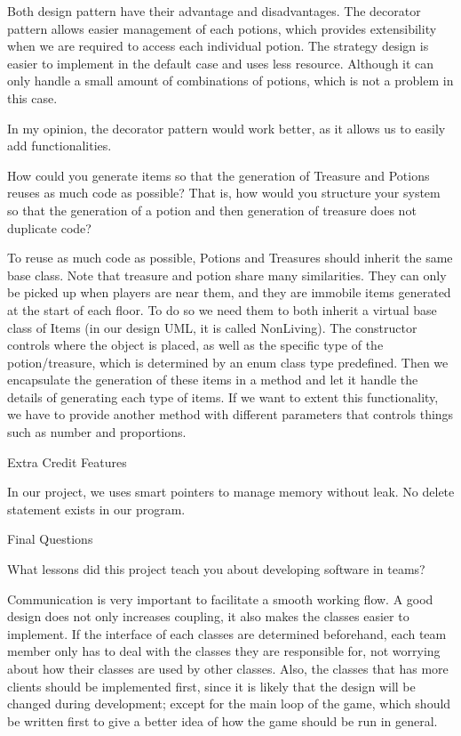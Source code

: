 \documentclass[11pt]{article}
\theoremstyle{plain} \newtheorem{theorem*}{Theorem}[subsection]
\begin{document}
Both design pattern have their advantage and disadvantages. The decorator
pattern allows easier management of each potions, which provides extensibility
when we are required to access each individual potion. The strategy design is
easier to implement in the default case and uses less resource. Although it can
only handle a small amount of combinations of potions, which is not a problem
in this case.  

In my opinion, the decorator pattern would work better, as it allows us to
easily add functionalities. 

How could you generate items so that the generation of Treasure and Potions
reuses as much code as possible? That is, how would you structure your system
so that the generation of a potion and then generation of treasure does not
duplicate code? 

To reuse as much code as possible, Potions and Treasures should inherit the
same base class. Note that treasure and potion share many similarities. They
can only be picked up when players are near them, and they are immobile items
generated at the start of each floor. To do so we need them to both inherit a
virtual base class of Items (in our design UML, it is called NonLiving). The
constructor controls where the object is placed, as well as the specific type
of the potion/treasure, which is determined by an enum class type predefined.
Then we encapsulate the generation of these items in a method and let it handle
the details of generating each type of items. If we want to extent this
functionality, we have to provide another method with different parameters that
controls things such as number and proportions. 



Extra Credit Features 

In our project, we uses smart pointers to manage memory without leak. No delete
statement exists in our program.  




Final Questions 

What lessons did this project teach you about developing software in teams? 

Communication is very important to facilitate a smooth working flow. A good
design does not only increases coupling, it also makes the classes easier to
implement. If the interface of each classes are determined beforehand, each
team member only has to deal with the classes they are responsible for, not
worrying about how their classes are used by other classes. Also, the classes
that has more clients should be implemented first, since it is likely that the
design will be changed during development; except for the main loop of the
game, which should be written first to give a better idea of how the game
should be run in general.  
\end{document}
